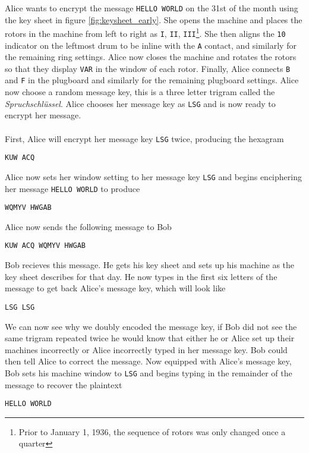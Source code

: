 \noindent Alice wants to encrypt the message \texttt{HELLO WORLD} on
the 31st of the month using the key sheet in figure
\ref{fig:keysheet_early}. She opens the machine and places the rotors in
the machine from left to right as \texttt{I}, \texttt{II},
\texttt{III}\footnote{Prior to January 1, 1936, the sequence of
	rotors was only changed once a quarter}. She then aligns the
\texttt{10} indicator on the
leftmost drum to be inline with the \texttt{A} contact, and similarly
for the remaining ring settings. Alice now closes the machine and
rotates the rotors so that they display \texttt{VAR} in the window of
each rotor. Finally, Alice connects \texttt{B} and \texttt{F} in the
plugboard and similarly for the remaining plugboard settings. Alice
now choose a random message key, this is a three letter trigram
called the \emph{Spruchschlüssel}. Alice chooses her message key as
\texttt{LSG} and is now ready to encrypt her message.
\\\\First, Alice will encrypt her message key \texttt{LSG} twice,
producing the hexagram
\begin{center}
	\texttt{KUW ACQ}
\end{center}
\noindent Alice now sets her window setting to her message key
\texttt{LSG} and begins enciphering her message \texttt{HELLO WORLD} to produce
\begin{center}
	\texttt{WQMYV HWGAB}
\end{center}
Alice now sends the following message to Bob
\begin{center}
	\texttt{KUW ACQ WQMYV HWGAB}
\end{center}
\noindent Bob recieves this message. He gets his key sheet and sets
up his machine as the key sheet describes for that day. He now types
in the first six letters of the message to get back Alice's message
key, which will look like
\begin{center}
	\texttt{LSG LSG}
\end{center}
We can now see why we doubly encoded the message key, if Bob did not
see the same trigram repeated twice he would know that either he or
Alice set up their machines incorrectly or Alice incorrectly typed in
her message key. Bob could then tell Alice to correct the message.
Now equipped with Alice's message key, Bob sets his machine window to
\texttt{LSG} and begins typing in the remainder of the message to
recover the plaintext
\begin{center}
	\texttt{HELLO WORLD}
\end{center}
